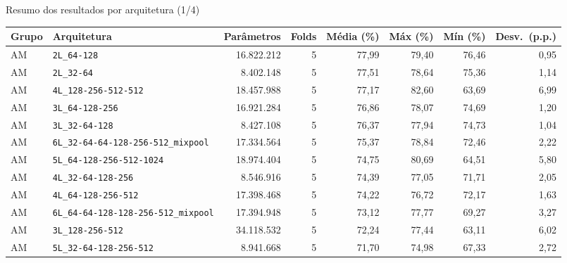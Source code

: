\documentclass[aspectratio=169,11pt]{beamer}
\begin{document}
\begin{frame}{Resumo dos resultados por arquitetura (1/4)}
  \centering
  \small
  \begin{adjustbox}{max width=\textwidth}
  \begin{tabular}{llrrrrrr}
    \toprule
    Grupo & Arquitetura & Parâmetros & Folds & Média (\%) & Máx (\%) & Mín (\%) & Desv.\ (p.p.) \\
    \midrule
    AM & \texttt{2L\_64-128} & 16.822.212 & 5 & 77,99 & 79,40 & 76,46 & 0,95 \\
    AM & \texttt{2L\_32-64} & 8.402.148 & 5 & 77,51 & 78,64 & 75,36 & 1,14 \\
    AM & \texttt{4L\_128-256-512-512} & 18.457.988 & 5 & 77,17 & 82,60 & 63,69 & 6,99 \\
    AM & \texttt{3L\_64-128-256} & 16.921.284 & 5 & 76,86 & 78,07 & 74,69 & 1,20 \\
    AM & \texttt{3L\_32-64-128} & 8.427.108 & 5 & 76,37 & 77,94 & 74,73 & 1,04 \\
    AM & \texttt{6L\_32-64-64-128-256-512\_mixpool} & 17.334.564 & 5 & 75,37 & 78,84 & 72,46 & 2,22 \\
    AM & \texttt{5L\_64-128-256-512-1024} & 18.974.404 & 5 & 74,75 & 80,69 & 64,51 & 5,80 \\
    AM & \texttt{4L\_32-64-128-256} & 8.546.916 & 5 & 74,39 & 77,05 & 71,71 & 2,05 \\
    AM & \texttt{4L\_64-128-256-512} & 17.398.468 & 5 & 74,22 & 76,72 & 72,17 & 1,63 \\
    AM & \texttt{6L\_64-64-128-128-256-512\_mixpool} & 17.394.948 & 5 & 73,12 & 77,77 & 69,27 & 3,27 \\
    AM & \texttt{3L\_128-256-512} & 34.118.532 & 5 & 72,24 & 77,44 & 63,11 & 6,02 \\
    AM & \texttt{5L\_32-64-128-256-512} & 8.941.668 & 5 & 71,70 & 74,98 & 67,33 & 2,72 \\
    \bottomrule
  \end{tabular}
  \end{adjustbox}
\end{frame}
\end{document}
